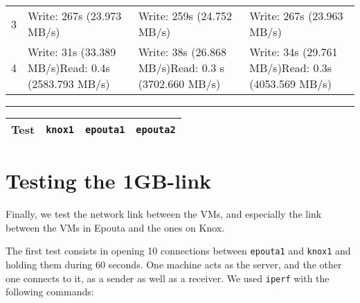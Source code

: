 \begin{longtable}[]{@{}rlll@{}}
\begin{minipage}[t]{0.07\columnwidth}\raggedleft\strut
3\strut
\end{minipage} & \begin{minipage}[t]{0.14\columnwidth}\raggedright\strut
Write: 267s (23.973 MB/s)\strut
\end{minipage} & \begin{minipage}[t]{0.14\columnwidth}\raggedright\strut
Write: 259s (24.752 MB/s)\strut
\end{minipage} & \begin{minipage}[t]{0.14\columnwidth}\raggedright\strut
Write: 267s (23.963 MB/s)\strut
\end{minipage}\tabularnewline
\begin{minipage}[t]{0.07\columnwidth}\raggedleft\strut
4\strut
\end{minipage} & \begin{minipage}[t]{0.14\columnwidth}\raggedright\strut
Write: 31s (33.389 MB/s)Read: 0.4s (2583.793 MB/s)\strut
\end{minipage} & \begin{minipage}[t]{0.14\columnwidth}\raggedright\strut
Write: 38s (26.868 MB/s)Read: 0.3 s (3702.660 MB/s)\strut
\end{minipage} & \begin{minipage}[t]{0.14\columnwidth}\raggedright\strut
Write: 34s (29.761 MB/s)Read: 0.3s (4053.569 MB/s)\strut
\end{minipage}\tabularnewline
\bottomrule
\end{longtable}

\begin{center}\rule{0.5\linewidth}{\linethickness}\end{center}

\begin{longtable}[]{@{}rlll@{}}
\toprule
Test & \texttt{knox1} & \texttt{epouta1} &
\texttt{epouta2}\tabularnewline
\midrule
\endhead
\bottomrule
\end{longtable}

\section{Testing the 1GB-link}\label{testing-the-1gb-link}

Finally, we test the network link between the VMs, and especially the
link between the VMs in Epouta and the ones on Knox.

The first test consists in opening 10 connections between
\texttt{epouta1} and \texttt{knox1} and holding them during 60 seconds.
One machine acts as the server, and the other one connects to it, as a
sender as well as a receiver. We used \texttt{iperf} with the following
commands:


